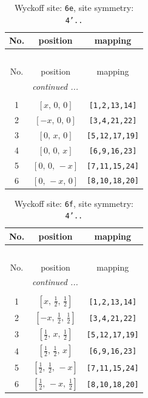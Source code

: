 \documentclass[fleqn,8pt]{jsarticle}
\begin{document}
\begin{longtable}{ccc}
\caption{Wyckoff site: {\tt 6e}, site symmetry: {\tt 4'..}}
 \\
 \hline \hline
No. & position & mapping \\ \hline \endfirsthead

\multicolumn{2}{l}{\tablename\ \thetable{}} \\
 \hline \hline
No. & position & mapping \\ \hline \endhead

 \hline \hline
\multicolumn{2}{r}{\footnotesize\it continued ...} \\ \endfoot

 \hline \hline
\multicolumn{2}{r}{} \\ \endlastfoot

1 & $\left[ x,\, 0,\, 0 \right]$ & {\tt [1,2,13,14]} \\ \hline
2 & $\left[ - x,\, 0,\, 0 \right]$ & {\tt [3,4,21,22]} \\ \hline
3 & $\left[ 0,\, x,\, 0 \right]$ & {\tt [5,12,17,19]} \\ \hline
4 & $\left[ 0,\, 0,\, x \right]$ & {\tt [6,9,16,23]} \\ \hline
5 & $\left[ 0,\, 0,\, - x \right]$ & {\tt [7,11,15,24]} \\ \hline
6 & $\left[ 0,\, - x,\, 0 \right]$ & {\tt [8,10,18,20]} \\
\end{longtable}
\renewcommand{\arraystretch}{1.2}
\begin{longtable}{ccc}
\caption{Wyckoff site: {\tt 6f}, site symmetry: {\tt 4'..}}
 \\
 \hline \hline
No. & position & mapping \\ \hline \endfirsthead

\multicolumn{2}{l}{\tablename\ \thetable{}} \\
 \hline \hline
No. & position & mapping \\ \hline \endhead

 \hline \hline
\multicolumn{2}{r}{\footnotesize\it continued ...} \\ \endfoot

 \hline \hline
\multicolumn{2}{r}{} \\ \endlastfoot

1 & $\left[ x,\, \frac{1}{2},\, \frac{1}{2} \right]$ & {\tt [1,2,13,14]} \\ \hline
2 & $\left[ - x,\, \frac{1}{2},\, \frac{1}{2} \right]$ & {\tt [3,4,21,22]} \\ \hline
3 & $\left[ \frac{1}{2},\, x,\, \frac{1}{2} \right]$ & {\tt [5,12,17,19]} \\ \hline
4 & $\left[ \frac{1}{2},\, \frac{1}{2},\, x \right]$ & {\tt [6,9,16,23]} \\ \hline
5 & $\left[ \frac{1}{2},\, \frac{1}{2},\, - x \right]$ & {\tt [7,11,15,24]} \\ \hline
6 & $\left[ \frac{1}{2},\, - x,\, \frac{1}{2} \right]$ & {\tt [8,10,18,20]} \\
\end{longtable}
\end{document}
